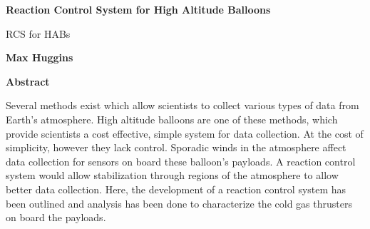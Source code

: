 \thispagestyle{plain}
\begin{center}
    \large
    \textbf{Reaction Control System for High Altitude Balloons}
        
    \vspace{0.4cm}
    \normalsize
    RCS for HABs
        
    \vspace{0.4cm}
    \textbf{Max Huggins}
       
    \vspace{0.9cm}
    \textbf{Abstract}
\end{center}
Several methods exist which allow scientists to collect various types of data from Earth's atmosphere. High altitude balloons are one of these methods, which provide scientists a cost effective, simple system for data collection. At the cost of simplicity, however they lack control. Sporadic winds in the atmosphere affect data collection for sensors on board these balloon's payloads. A reaction control system would allow stabilization through regions of the atmosphere to allow better data collection. Here, the development of a reaction control system has been outlined and analysis has been done to characterize the cold gas thrusters on board the payloads. 